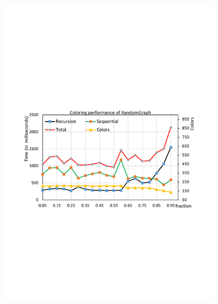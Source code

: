 \begin{figure}[t]
{		\includegraphics[scale=0.2]{figure/exp/random.pdf}
	}
	\subfloat[Twitter]{
		\label{fig:twitter}
}
\end{figure}
